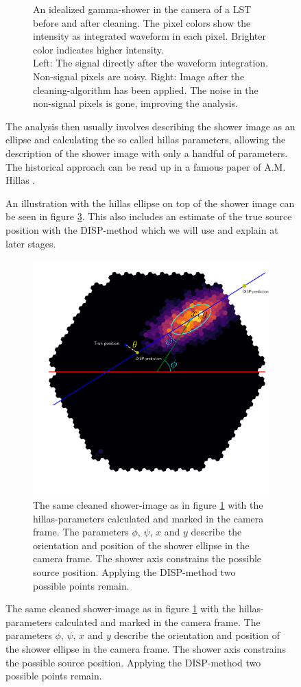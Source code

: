 \begin{figure}
\begin{figure}
\begin{subfigure}{.45\textwidth}
	\end{subfigure}
	\caption{An idealized gamma-shower in the camera of a LST
	    before and after cleaning.
		The pixel colors show the intensity as integrated 
		waveform in each pixel. 
		Brighter color indicates higher intensity.\\
		Left: The signal directly after
		the waveform integration. Non-signal pixels are noisy. 
		Right: Image after the cleaning-algorithm has been 
		applied. The noise in the non-signal pixels is gone,
		improving the analysis.}
	\label{fig:shower_cleaning}
\end{figure}

The analysis then usually involves describing the 
shower image as an ellipse and calculating the so called hillas parameters,
allowing the description of the shower image with only a handful of parameters.
The historical approach can be read up in 
a famous paper of A.M. Hillas \cite{hillas_params}.

An illustration with the hillas ellipse on top of the shower image 
can be seen in figure \ref{fig:hillas_params}.
This also includes an estimate of the true source position with the DISP-method
which we will use and explain at later stages.

\begin{figure}
	\centering	
	\captionsetup{width=0.9\linewidth}
	\includegraphics[width=.6\textwidth]{Plots/hillas_complete.pdf}
	\caption{The same cleaned shower-image as in figure \ref{fig:shower_cleaning}
	with the hillas-parameters calculated and marked in the camera frame.
	The parameters $\phi$, $\psi$, $x$ and $y$ describe the 
	orientation and position of the shower ellipse in the camera frame.
	The shower axis constrains the possible source position. 
	Applying the DISP-method two possible points remain.}
	\label{fig:hillas_params}
\end{figure}


\end{figure}
